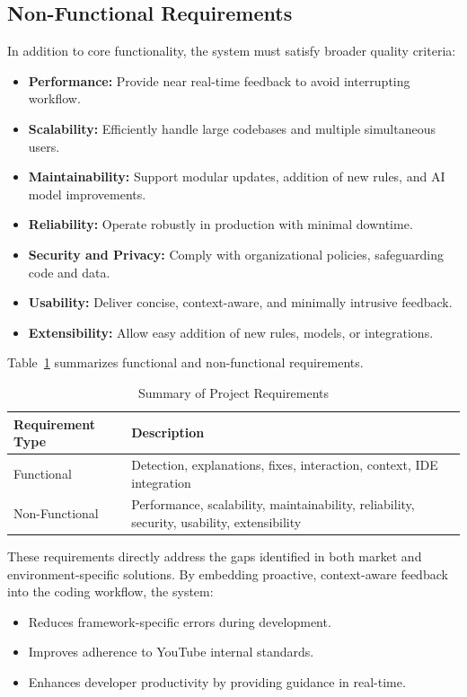 \begin{spacing}{1.2}
\subsection{Non-Functional Requirements}

In addition to core functionality, the system must satisfy broader quality criteria:

\begin{itemize}
\item \textbf{Performance:} Provide near real-time feedback to avoid interrupting workflow.
\item \textbf{Scalability:} Efficiently handle large codebases and multiple simultaneous users.
\item \textbf{Maintainability:} Support modular updates, addition of new rules, and AI model improvements.
\item \textbf{Reliability:} Operate robustly in production with minimal downtime.
\item \textbf{Security and Privacy:} Comply with organizational policies, safeguarding code and data.
\item \textbf{Usability:} Deliver concise, context-aware, and minimally intrusive feedback.
\item \textbf{Extensibility:} Allow easy addition of new rules, models, or integrations.
\end{itemize}

Table~\ref{tab:extended_requirements} summarizes functional and non-functional requirements.

\begin{table}[H]
\centering
\caption{Summary of Project Requirements}
\label{tab:extended_requirements}
\begin{tabular}{|p{3cm}|p{11cm}|}
\hline
\textbf{Requirement Type} & \textbf{Description} \\
\hline
Functional & Detection, explanations, fixes, interaction, context, IDE integration \\
\hline
Non-Functional & Performance, scalability, maintainability, reliability, security, usability, extensibility \\
\hline
\end{tabular}
\end{table}


These requirements directly address the gaps identified in both market and environment-specific solutions. By embedding proactive, context-aware feedback into the coding workflow, the system:

\begin{itemize}
\item Reduces framework-specific errors during development.
\item Improves adherence to YouTube internal standards.
\item Enhances developer productivity by providing guidance in real-time.
\end{itemize}


\end{spacing}

